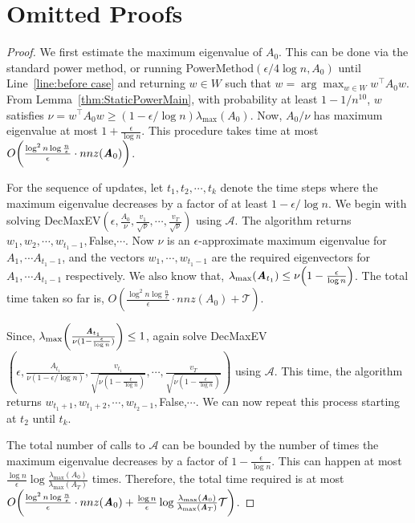 \documentclass[11pt]{article}
\let\originalleft\left
\let\originalright\right
\renewcommand{\left}{\mathopen{}\mathclose\bgroup\originalleft}
\renewcommand{\right}{\aftergroup\egroup\originalright}
\newcommand\vv{\boldsymbol{\mathit{v}}}
\newcommand\ww{\boldsymbol{\mathit{w}}}
\renewcommand\AA{\boldsymbol{\mathit{A}}}
\newcommand\WW{\boldsymbol{\mathit{W}}}
\begin{document}
\section{Omitted Proofs}
\Decision*
\begin{proof}
We first estimate the maximum eigenvalue of $\AA_0$. This can be done via the standard power method, or running {\sc PowerMethod}$(\epsilon/4\log n, \AA_0)$ until Line~\ref{line:before case} and returning $\ww\in \WW$ such that $\ww= \arg\max_{\ww\in \WW}\ww^{\top}\AA_0\ww$. From Lemma~\ref{thm:StaticPowerMain}, with probability at least $1-1/n^{10}$, $\ww$ satisfies $\nu = \ww^{\top}\AA_0\ww\geq (1-\epsilon/\log n)\lambda_{\max}(\AA_0)$. Now, $\AA_0/\nu$ has maximum eigenvalue at most $1+\frac{\epsilon}{\log n}$. This procedure takes time at most $O\left(\frac{\log^2 n\log\frac{n}{\epsilon}}{\epsilon}\cdot nnz(\AA_0)\right)$.

   For the sequence of updates, let $t_1,t_2,\cdots,t_k$ denote the time steps where the maximum eigenvalue decreases by a factor of at least $1-\epsilon/\log n$. We begin with solving {\sc DecMaxEV}$(\epsilon,\frac{\AA_0}{\nu},\frac{\vv_1}{\sqrt{\nu}},\cdots, \frac{\vv_T}{\sqrt{\nu}})$ using $\mathcal{A}$.  The algorithm returns $\ww_1,\ww_2,\cdots,\ww_{t_1-1},${\sc False},$\cdots$. Now $\nu$ is an $\epsilon$-approximate maximum eigenvalue for $\AA_1,\cdots \AA_{t_1-1}$, and the vectors $\ww_1,\cdots,\ww_{t_1-1}$ are the required eigenvectors for $\AA_1,\cdots \AA_{t_1-1}$ respectively. We also know that, $\lambda_{\max}(\AA_{t_1})\leq \nu\left(1-\frac{\epsilon}{\log n}\right)$. The total time taken so far is, $O(\frac{\log^2 n\log\frac{n}{\epsilon}}{\epsilon}\cdot nnz(\AA_0) + \mathcal{T})$. 

   Since, $\lambda_{\max}\left(\frac{\AA_{t_1}}{\nu(1-\frac{\epsilon}{\log n})}\right)\leq 1$, again solve {\sc DecMaxEV}$(\epsilon,\frac{\AA_{t_1}}{\nu(1-\epsilon/\log n)},\frac{\vv_{t_1}}{\sqrt{\nu(1-\frac{\epsilon}{\log n})}},\cdots, \frac{\vv_T}{\sqrt{\nu(1-\frac{\epsilon}{\log n})}})$ using $\mathcal{A}$. This time, the algorithm returns $\ww_{t_1+1},\ww_{t_1+2},\cdots, \ww_{t_2-1},${\sc False},$\cdots$. We can now repeat this process starting at $t_2$ until $t_k$.

   The total number of calls to $\mathcal{A}$ can be bounded by the number of times the maximum eigenvalue decreases by a factor of $1-\frac{\epsilon}{\log n}$. This can happen at most $\frac{\log n}{\epsilon}\log \frac{\lambda_{\max}(\AA_0)}{\lambda_{\max}(\AA_T)}$ times. Therefore, the total time required is at most $O\left(\frac{\log^2 n\log\frac{n}{\epsilon}}{\epsilon}\cdot nnz(\AA_0) + \frac{\log n}{\epsilon}\log \frac{\lambda_{\max}(\AA_0)}{\lambda_{\max}(\AA_T)}\mathcal{T}\right)$.
\end{proof}
\end{document}
